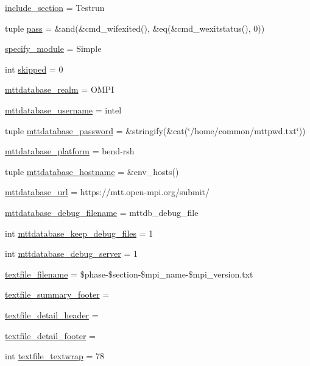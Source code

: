 \begin{DoxyCompactItemize}
\item 
\hyperlink{namespacehwtest_a62c9c5709c2605f42860f5424551007f}{include\-\_\-section} = Testrun
\item 
tuple \hyperlink{namespacehwtest_aba9f32241019e8b74b8155d5fe25a326}{pass} = \&and(\&cmd\-\_\-wifexited(), \&eq(\&cmd\-\_\-wexitstatus(), 0))
\item 
\hyperlink{namespacehwtest_a776d2af9b2bb100b49d3709b6e256797}{specify\-\_\-module} = Simple
\item 
int \hyperlink{namespacehwtest_a52e9a2d299cf53080aa90654ddcaf209}{skipped} = 0
\item 
\hyperlink{namespacehwtest_a06dff656b8aa4743a2d09ea2a47e088b}{mttdatabase\-\_\-realm} = O\-M\-P\-I
\item 
\hyperlink{namespacehwtest_a78763492ac95e935dc66de47a7b24374}{mttdatabase\-\_\-username} = intel
\item 
tuple \hyperlink{namespacehwtest_a62683e098488d08966d4a339bb945d9c}{mttdatabase\-\_\-password} = \&stringify(\&cat(\char`\"{}/home/common/mttpwd.\-txt\char`\"{}))
\item 
\hyperlink{namespacehwtest_afe5c3aa0d87e5e74558741e81b9d39ce}{mttdatabase\-\_\-platform} = bend-\/rsh
\item 
tuple \hyperlink{namespacehwtest_a2561ee660a1987af3681c21d61bce282}{mttdatabase\-\_\-hostname} = \&env\-\_\-hosts()
\item 
\hyperlink{namespacehwtest_a4a582498db594ca409429642d4690a1d}{mttdatabase\-\_\-url} = https\-://mtt.\-open-\/mpi.\-org/submit/
\item 
\hyperlink{namespacehwtest_aaf511fc503606c1808a06d8da809263e}{mttdatabase\-\_\-debug\-\_\-filename} = mttdb\-\_\-debug\-\_\-file
\item 
int \hyperlink{namespacehwtest_a4038849f56dda68ae47f22d2945ddf21}{mttdatabase\-\_\-keep\-\_\-debug\-\_\-files} = 1
\item 
int \hyperlink{namespacehwtest_a1da4b943796a82979729d658ea0e913d}{mttdatabase\-\_\-debug\-\_\-server} = 1
\item 
\hyperlink{namespacehwtest_ad10ebcdde85ff5608f5b974987766b82}{textfile\-\_\-filename} = \$phase-\/\$section-\/\$mpi\-\_\-name-\/\$mpi\-\_\-version.\-txt
\item 
\hyperlink{namespacehwtest_a75ec114b65b92671173085f162edb84f}{textfile\-\_\-summary\-\_\-footer} =
\item 
\hyperlink{namespacehwtest_ae80f390eb87caf3467f8b53883932b9f}{textfile\-\_\-detail\-\_\-header} =
\item 
\hyperlink{namespacehwtest_acf23440e8c05d17e5b3bb0c6a6a7a12a}{textfile\-\_\-detail\-\_\-footer} =
\item 
int \hyperlink{namespacehwtest_ae9e1387323c72cd6970ef27480e3ea21}{textfile\-\_\-textwrap} = 78
\end{DoxyCompactItemize}



